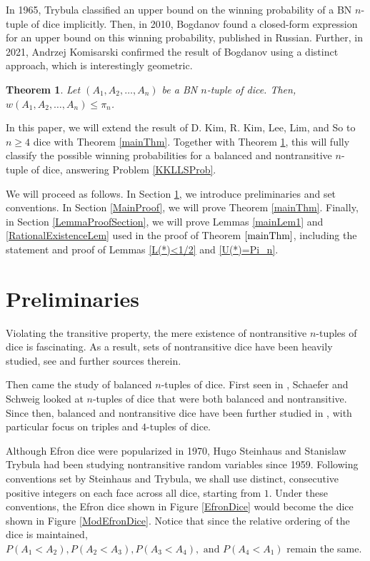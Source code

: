 \documentclass[11pt]{article}
\newtheorem{theorem}{Theorem}[section]
\theoremstyle{definition}
\begin{document}
In 1965, Trybula \cite{Trybula65} classified an upper bound on the winning probability of a BN $n$-tuple of dice implicitly. Then, in 2010, Bogdanov \cite{Bogdanov2010} found a closed-form expression for an upper bound on this winning probability, published in Russian. Further, in 2021, Andrzej Komisarski \cite{Komisarski2021} confirmed the result of Bogdanov using a distinct approach, which is interestingly geometric.
\begin{theorem}\label{Komisarski}
    \cite{Bogdanov2010, Komisarski2021} Let $(A_1,A_2,\dots, A_n)$ be a BN $n$-tuple of dice. Then, $w(A_1,A_2,\dots,A_n) \leq \pi_n$.
\end{theorem}

In this paper, we will extend the result of D. Kim, R. Kim, Lee, Lim, and So to $n \geq 4$ dice with Theorem \ref{mainThm}. Together with Theorem \ref{Komisarski}, this will fully classify the possible winning probabilities for a balanced and nontransitive $n$-tuple of dice, answering Problem \ref{KKLLSProb}.


We will proceed as follows. In Section \ref{Preliminaries}, we introduce preliminaries and set conventions. In Section \ref{MainProof}, we will prove Theorem \ref{mainThm}. Finally, in Section \ref{LemmaProofSection}, we will prove Lemmas \ref{mainLem1} and \ref{RationalExistenceLem} used in the proof of Theorem $\ref{mainThm}$, including the statement and proof of Lemmas \ref{L(*)<1/2} and \ref{U(*)=Pi_n}.

\section{Preliminaries}\label{Preliminaries}

Violating the transitive property, the mere existence of nontransitive $n$-tuples of dice is fascinating. As a result, sets of nontransitive dice have been heavily studied, see \cite{AngelDavis,BGH,kronenthal2009tied, savage1994paradox} and further sources therein.

Then came the study of balanced $n$-tuples of dice. First seen in \cite{SchaeferSchweig2017}, Schaefer and Schweig looked at $n$-tuples of dice that were both balanced and nontransitive. Since then, balanced and nontransitive dice have been further studied in \cite{HurKim, joyce2020strongly, schaefer2011balanced, SchaeferSolo2017}, with particular focus on triples and $4$-tuples of dice.


Although Efron dice were popularized in 1970, Hugo Steinhaus and Stanislaw Trybula \cite{SteinhausTrybula1959} had been studying nontransitive random variables since 1959. Following conventions set by Steinhaus and Trybula, we shall use distinct, consecutive positive integers on each face across all dice, starting from $1$. Under these conventions, the Efron dice shown in Figure \ref{EfronDice} would become the dice shown in Figure \ref{ModEfronDice}. Notice that since the relative ordering of the dice is maintained, $P(A_1<A_2), P(A_2<A_3),P(A_3<A_4), \text{ and } P(A_4<A_1)$ remain the same.
\end{document}
